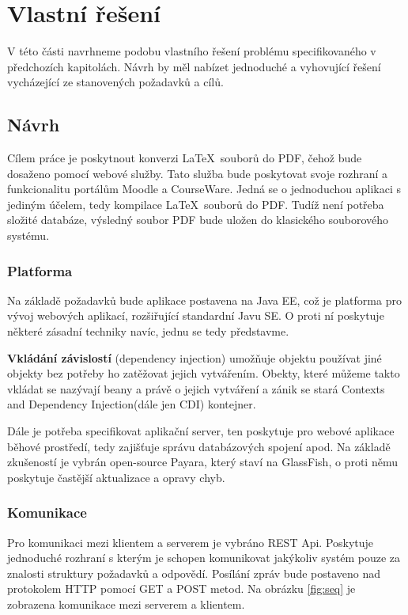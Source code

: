 \chapter{Vlastní řešení}  

V této části navrhneme podobu vlastního řešení problému specifikovaného v předchozích kapitolách. Návrh by měl nabízet jednoduché a vyhovující řešení vycházející ze stanovených požadavků a cílů. 

\section{Návrh}

Cílem práce je poskytnout konverzi \LaTeX\ souborů do PDF, čehož bude dosaženo pomocí webové služby. Tato služba bude poskytovat svoje rozhraní a funkcionalitu portálům Moodle a CourseWare. Jedná se o jednoduchou aplikaci s jediným účelem, tedy kompilace \LaTeX\ souborů do PDF. Tudíž není potřeba složité databáze, výsledný soubor PDF bude uložen do klasického souborového systému. 

\subsection{Platforma}
Na základě požadavků bude aplikace postavena na Java EE, což je platforma pro vývoj webových aplikací, rozšiřující standardní Javu SE. O proti ní poskytuje některé zásadní techniky navíc, jednu se tedy představme. 
\par
\textbf{Vkládání závislostí} (dependency injection) umožňuje objektu používat jiné objekty bez potřeby ho zatěžovat jejich vytvářením. Obekty, které můžeme takto vkládat se nazývají beany a právě o jejich vytváření a zánik se stará Contexts and Dependency Injection(dále jen CDI) kontejner.
\\[12pt]
\par
Dále je potřeba specifikovat aplikační server, ten poskytuje pro webové aplikace běhové prostředí, tedy zajišťuje správu databázových spojení apod. Na základě zkušeností je vybrán open-source Payara, který staví na GlassFish, o proti němu poskytuje častější aktualizace a opravy chyb. 

\subsection{Komunikace}
Pro komunikaci mezi klientem a serverem je vybráno REST Api. Poskytuje jednoduché rozhraní s kterým je schopen komunikovat jakýkoliv systém pouze za znalosti struktury požadavků a odpovědí. Posílání zpráv bude postaveno nad protokolem HTTP pomocí GET a POST metod. Na obrázku \ref{fig:seq} je zobrazena komunikace mezi serverem a klientem. 

